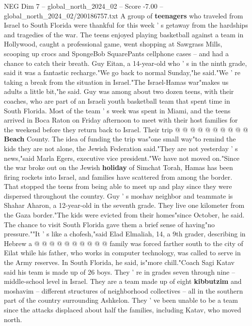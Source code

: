 \begin{textsample}{NEG Dim 7 – global\_north\_2024\_02 – Score -7.00 – global\_north\_2024\_02/200186757.txt}  \label{ex:f7_neg_282}
A group of \textbf{teenagers} who traveled from Israel to South Florida were thankful for this week ' s getaway from the hardships and tragedies of the war.
The teens enjoyed playing basketball against a team in Hollywood, caught a professional game, went shopping at Sawgrass Mills, scooping up crocs and SpongeBob SquarePants cellphone cases -- and had a chance to catch their breath.
Guy Eitan, a 14-year-old who ' s in the ninth grade, said it was a fantastic recharge."We go back to normal Sunday,"he said."We ' re taking a break from the situation in Israel."The Israel-Hamas war"makes us adults a little bit,"he said.
Guy was among about two dozen teens, with their coaches, who are part of an Israeli youth basketball team that spent time in South Florida.
Most of the team ' s week was spent in Miami, and the teens arrived in Boca Raton on Friday afternoon to meet with their host families for the weekend before they return back to Israel.
Their trip @ @ @ @ @ @ @ @ @ @ \textbf{Beach} County.
The idea of funding the trip was"one small way"to remind the kids they are not alone, the Jewish Federation said."They are not yesterday ' s news,"said Marla Egers, executive vice president."We have not moved on."Since the war broke out on the Jewish \textbf{holiday} of Simchat Torah, Hamas has been firing rockets into Israel, and families have scattered from among the border.
That stopped the teens from being able to meet up and play since they were dispersed throughout the country.
Guy ' s moshav neighbor and teammate is Shahar Aharon, a 12-year-old in the seventh grade.
They live one kilometer from the Gaza border."The kids were evicted from their homes"since October, he said.
The chance to visit South Florida gave them a brief sense of having"no pressure.""It ' s like a chofesh,"said Elad Elmaliah, 14, a 9th grader, describing in Hebrew a @ @ @ @ @ @ @ @ @ @ family was forced farther south to the city of Eilat while his father, who works in computer technology, was called to serve in the Army reserves.
In South Florida, he said, is"more chill."Coach Sagi Katav said his team is made up of 26 boys.
They ' re in grades seven through nine -- middle-school level in Israel.
They are a team made up of eight \textbf{kibbutzim} and moshavim -- different structures of neighborhood collectives -- all in the southern part of the country surrounding Ashkelon.
They ' ve been unable to be a team since the attacks displaced about half the families, including Katav, who moved north.

\end{textsample}
